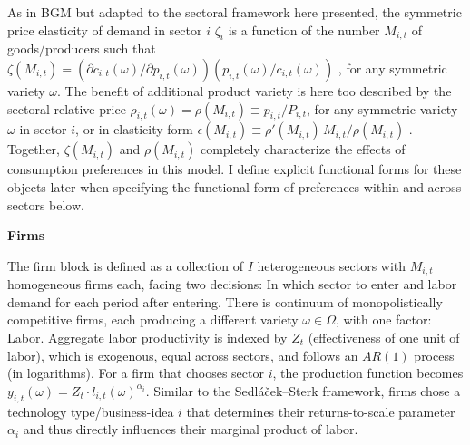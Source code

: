 \documentclass[a4paper,12pt]{article} %
\numberwithin{equation}{section} %
\numberwithin{figure}{section}
\numberwithin{table}{section}
\begin{document}
As in BGM but adapted to the sectoral framework here presented, the symmetric price elasticity of demand in sector $i$ $\zeta_i$  is a function 
of the number $M_{i,t}$ of goods/producers such that $\zeta (M_{i,t}) = (\partial c_{i,t}(\omega)/\partial p_{i,t}(\omega))(p_{i,t}(\omega)/c_{i,t}(\omega))$
, for any symmetric variety $\omega$. The benefit of additional product variety is here too described by the sectoral relative price $\rho_{i,t}(\omega) =
\rho(M_{i,t}) \equiv p_{i,t}/P_{i,t}$, for any symmetric variety $\omega$ in sector $i$, or in elasticity form $\epsilon(M_{i,t}) \equiv \rho'(M_{i,t})\,M_{i,t}/\rho(M_{i,t})$
. Together, $\zeta(M_{i,t})$ and $\rho (M_{i,t})$ completely 
characterize the effects of consumption preferences in this model. I define explicit functional forms for these objects later when specifying the 
functional form of preferences within and across sectors below.


\medskip
\medskip
\noindent\textbf{Firms}
\medskip

The firm block is defined as a collection of $I$ heterogeneous sectors with $M_{i,t}$ homogeneous firms each, 
facing two decisions: In which sector to enter and labor demand for each period after entering. There is continuum of monopolistically competitive
firms, each producing a different variety $\omega \in \Omega$, with one factor: Labor. 
Aggregate labor productivity is indexed by $Z_t$ (effectiveness of one unit of labor), which is 
exogenous, equal across sectors, and follows an $AR(1)$ process (in logarithms). For a firm that chooses sector $i$, the production function becomes
$y_{i,t}(\omega) = Z_t \cdot l_{i,t}(\omega)^{\alpha_i}$. Similar to the Sedláček–Sterk framework, firms chose a technology type/business-idea $i$ 
that determines their returns-to-scale parameter $\alpha_i$ and thus directly influences their marginal product of labor.
\end{document}
